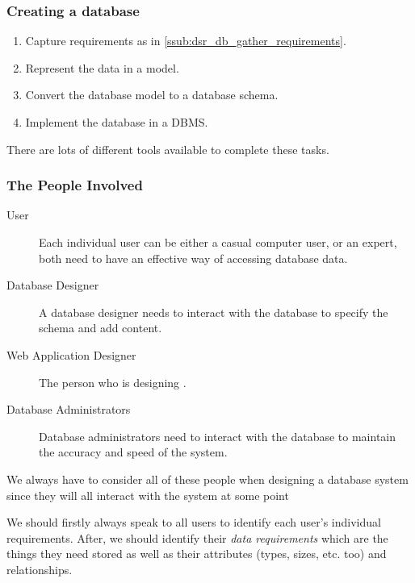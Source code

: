 \subsubsection{Creating a database}\label{ssub:creating_a_database}

\begin{enumerate}
    \item Capture requirements as in \cref{ssub:dsr_db_gather_requirements}.
    \item Represent the data in a model.
    \item Convert the database model to a database schema.
    \item Implement the database in a DBMS.
\end{enumerate}

\begin{note}
    There are lots of different tools available to complete these tasks.
\end{note}

\subsubsection{The People Involved}\label{ssub:the_people_involved}

\begin{description}
    \item[User] Each individual user can be either a casual computer user, or an expert, both need to have an effective way of accessing database data.
    \item[Database Designer] A database designer needs to interact with the database to specify the schema and add content.
    \item[Web Application Designer] The person who is designing .
    \item[Database Administrators] Database administrators need to interact with the database to maintain the accuracy and speed of the system.
\end{description}

\begin{note}
    We always have to consider all of these people when designing a database system since they will all interact with the system at some point
\end{note}

We should firstly always speak to all users to identify each user's individual requirements.
After, we should identify their \emph{data requirements} which are the things they need stored as well as their attributes (types, sizes, etc. too) and relationships.

